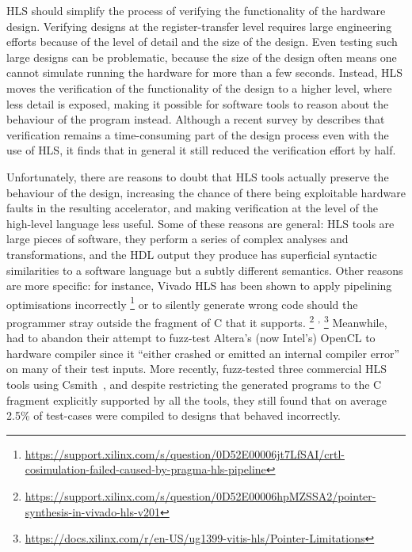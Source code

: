 \Gls{HLS} should simplify the process of verifying the functionality of the
hardware design.  Verifying designs at the register-transfer level requires
large engineering efforts because of the level of detail and the size of the
design.  Even testing such large designs can be problematic, because the size of
the design often means one cannot simulate running the hardware for more than a
few seconds.  Instead, \gls{HLS} moves the verification of the functionality of
the design to a higher level, where less detail is exposed, making it possible
for software tools to reason about the behaviour of the program
instead. Although a recent survey by \textcite{lahti19_are_we_there_yet}
describes that verification remains a time-consuming part of the design process
even with the use of \gls{HLS}, it finds that in general it still reduced the
verification effort by half.

Unfortunately, there are reasons to doubt that \gls{HLS} tools actually preserve
the behaviour of the design, increasing the chance of there being exploitable
hardware faults in the resulting accelerator, and making verification at the
level of the high-level language less useful.  Some of these reasons are
general: \gls{HLS} tools are large pieces of software, they perform a series of
complex analyses and transformations, and the \gls{HDL} output they produce has
superficial syntactic similarities to a software language but a subtly different
semantics.  Other reasons are more specific: for instance, Vivado HLS has been
shown to apply pipelining optimisations incorrectly%
\footnote{\url{https://support.xilinx.com/s/question/0D52E00006jt7LfSAI/crtl-cosimulation-failed-caused-by-pragma-hls-pipeline}} %
or to silently generate wrong code should the programmer stray outside the
fragment of C that it supports.%
\footnote{\url{https://support.xilinx.com/s/question/0D52E00006hpMZSSA2/pointer-synthesis-in-vivado-hls-v201}}%
\textsuperscript{,}%
\footnote{\url{https://docs.xilinx.com/r/en-US/ug1399-vitis-hls/Pointer-Limitations}}
Meanwhile, \textcite{lidbury15_many_core_compil_fuzzin} had to abandon their
attempt to fuzz-test Altera's (now Intel's) OpenCL to hardware compiler since it
\enquote{either crashed or emitted an internal compiler error} on many of their
test inputs.  More recently, \textcite{herklotz21_esrhlst} fuzz-tested three
commercial \gls{HLS} tools using
Csmith~\cite{yang11_findin_under_bugs_c_compil}, and despite restricting the
generated programs to the C fragment explicitly supported by all the tools, they
still found that on average 2.5\% of test-cases were compiled to designs that
behaved incorrectly.


